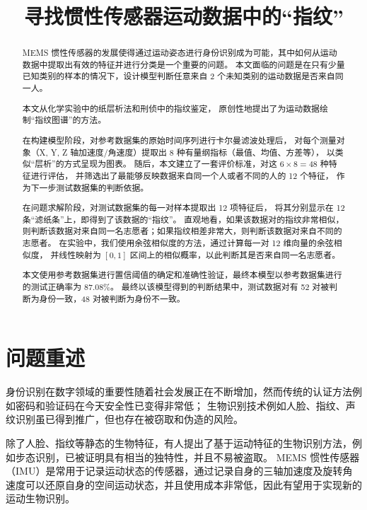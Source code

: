 \documentclass[withoutpreface]{cumcmthesis}
\title{寻找惯性传感器运动数据中的“指纹”}
\begin{document}

\maketitle

\begin{abstract}
MEMS 惯性传感器的发展使得通过运动姿态进行身份识别成为可能，其中如何从运动数据中提取出有效的特征并进行分类是一个重要的问题。
本文面临的问题是在只有少量已知类别的样本的情况下，设计模型判断任意来自 2 个未知类别的运动数据是否来自同一人。

本文从化学实验中的纸层析法和刑侦中的指纹鉴定，
原创性地提出了为运动数据绘制“指纹图谱”的方法。

在构建模型阶段，对参考数据集的原始时间序列进行卡尔曼滤波处理后，
对每个测量对象（X, Y, Z 轴加速度/角速度）提取出 8 种有量纲指标（最值、均值、方差等），
以类似“层析”的方式呈现为图表。
随后，本文建立了一套评价标准，对这 $6 \times 8 = 48$ 种特征进行评估，
并筛选出了最能够反映数据来自同一个人或者不同的人的 12 个特征，
作为下一步测试数据集的判断依据。

在问题求解阶段，对测试数据集的每一对样本提取出 12 项特征后，
将其分别显示在 12 条“滤纸条”上，即得到了该数据的“指纹”。
直观地看，如果该数据对的指纹非常相似，则判断该数据对来自同一名志愿者；如果指纹相差非常大，则判断该数据对来自不同的志愿者。
在实验中，我们使用余弦相似度的方法，通过计算每一对 12 维向量的余弦相似度，
并线性映射为 $[0, 1]$ 区间上的相似概率，以此判断其是否来自同一名志愿者。

本文使用参考数据集进行置信阈值的确定和准确性验证，最终本模型以参考数据集进行的测试正确率为 87.08\%。
最终以该模型得到的判断结果中，测试数据对有 52 对被判断为身份一致，48 对被判断为身份不一致。


\end{abstract}

\tableofcontents

\newpage

\section{问题重述}

身份识别在数字领域的重要性随着社会发展正在不断增加，然而传统的认证方法例如密码和验证码在今天安全性已变得非常低；
生物识别技术例如人脸、指纹、声纹识别虽已得到推广，但也存在被窃取和伪造的风险。

除了人脸、指纹等静态的生物特征，有人提出了基于运动特征的生物识别方法，例如步态识别，已被证明具有相当的独特性，并且不易被盗取。
MEMS 惯性传感器（IMU）是常用于记录运动状态的传感器，通过记录自身的三轴加速度及旋转角速度可以还原自身的空间运动状态，并且使用成本非常低，因此有望用于实现新的运动生物识别。
\end{document}
